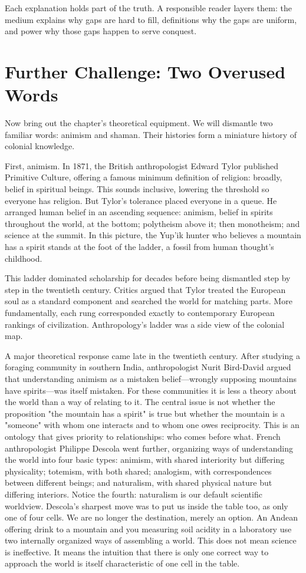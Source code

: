 Each explanation holds part of the truth. A responsible reader layers them: the medium explains why gaps are hard to fill, definitions why the gaps are uniform, and power why those gaps happen to serve conquest.

\section{Further Challenge: Two Overused Words}
Now bring out the chapter's theoretical equipment. We will dismantle two familiar words: animism and shaman. Their histories form a miniature history of colonial knowledge.

First, animism. In 1871, the British anthropologist Edward Tylor published Primitive Culture, offering a famous minimum definition of religion: broadly, belief in spiritual beings. This sounds inclusive, lowering the threshold so everyone has religion. But Tylor's tolerance placed everyone in a queue. He arranged human belief in an ascending sequence: animism, belief in spirits throughout the world, at the bottom; polytheism above it; then monotheism; and science at the summit. In this picture, the Yup'ik hunter who believes a mountain has a spirit stands at the foot of the ladder, a fossil from human thought's childhood.

This ladder dominated scholarship for decades before being dismantled step by step in the twentieth century. Critics argued that Tylor treated the European soul as a standard component and searched the world for matching parts. More fundamentally, each rung corresponded exactly to contemporary European rankings of civilization. Anthropology's ladder was a side view of the colonial map.

A major theoretical response came late in the twentieth century. After studying a foraging community in southern India, anthropologist Nurit Bird-David argued that understanding animism as a mistaken belief---wrongly supposing mountains have spirits---was itself mistaken. For these communities it is less a theory about the world than a way of relating to it. The central issue is not whether the proposition "the mountain has a spirit" is true but whether the mountain is a "someone" with whom one interacts and to whom one owes reciprocity. This is an ontology that gives priority to relationships: who comes before what. French anthropologist Philippe Descola went further, organizing ways of understanding the world into four basic types: animism, with shared interiority but differing physicality; totemism, with both shared; analogism, with correspondences between different beings; and naturalism, with shared physical nature but differing interiors. Notice the fourth: naturalism is our default scientific worldview. Descola's sharpest move was to put us inside the table too, as only one of four cells. We are no longer the destination, merely an option. An Andean offering drink to a mountain and you measuring soil acidity in a laboratory use two internally organized ways of assembling a world. This does not mean science is ineffective. It means the intuition that there is only one correct way to approach the world is itself characteristic of one cell in the table.


